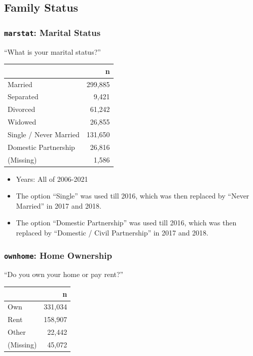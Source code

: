 \documentclass[10pt,article,oneside]{memoir}
\theoremstyle{definition}
\begin{document}
\hypertarget{family-status}{%
\subsection{Family Status}\label{family-status}}

\hypertarget{marstat-marital-status}{%
\subsubsection{\texorpdfstring{\texttt{marstat}: Marital
Status}{marstat: Marital Status}}\label{marstat-marital-status}}

``What is your marital status?''

\begin{table}[H]
\centering
\begin{tabular}[t]{lr}
\toprule
 & n\\
\midrule
Married & 299,885\\
Separated & 9,421\\
Divorced & 61,242\\
Widowed & 26,855\\
Single / Never Married & 131,650\\
Domestic Partnership & 26,816\\
(Missing) & 1,586\\
\bottomrule
\end{tabular}
\end{table}

\begin{itemize}
\tightlist
\item
  Years: All of 2006-2021
\item
  The option ``Single'' was used till 2016, which was then replaced by
  ``Never Married'' in 2017 and 2018.
\item
  The option ``Domestic Partnership'' was used till 2016, which was then
  replaced by ``Domestic / Civil Partnership'' in 2017 and 2018.
\end{itemize}

\hypertarget{ownhome-home-ownership}{%
\subsubsection{\texorpdfstring{\texttt{ownhome}: Home
Ownership}{ownhome: Home Ownership}}\label{ownhome-home-ownership}}

``Do you own your home or pay rent?''

\begin{table}[H]
\centering
\begin{tabular}[t]{lr}
\toprule
 & n\\
\midrule
Own & 331,034\\
Rent & 158,907\\
Other & 22,442\\
(Missing) & 45,072\\
\bottomrule
\end{tabular}
\end{table}
\end{document}
